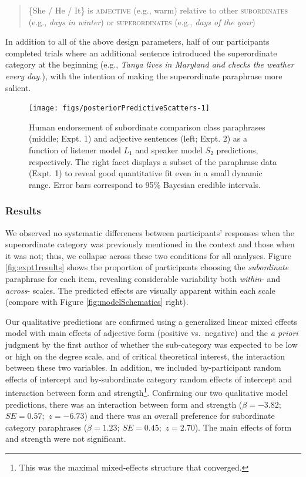 \documentclass[doc]{apa6}
\begin{document}
\begin{quote}
\{She / He / It\} is \textsc{adjective} (e.g., warm) relative to other
\textsc{subordinates} (e.g., \emph{days in winter}) or
\textsc{superordinates} (e.g., \emph{days of the year})
\end{quote}

In addition to all of the above design parameters, half of our
participants completed trials where an additional sentence introduced
the superordinate category at the beginning (e.g., \emph{Tanya lives in
Maryland and checks the weather every day.}), with the intention of
making the superordinate paraphrase more salient.

\begin{figure}[htb]

{\centering \texttt{[image: figs/posteriorPredictiveScatters-1]} 

}

\caption{Human endorsement of subordinate comparison class paraphrases (middle; Expt. 1) and adjective sentences (left; Expt. 2) as a function of listener model $L_1$ and speaker model $S_2$ predictions, respectively. The right facet displays a subset of the paraphrase data (Expt. 1) to reveal good quantitative fit even in a small dynamic range. Error bars correspond to 95\% Bayesian credible intervals.}\label{fig:posteriorPredictiveScatters}
\end{figure}

\subsubsection{Results}

We observed no systematic differences between participants' responses when the superordinate category was previously mentioned in the context and those when it was not; thus, we collapse across these two conditions for all analyses. Figure \ref{fig:expt1results} shows the proportion of participants choosing the \emph{subordinate} paraphrase for each item, revealing considerable variability both \emph{within}- and \emph{across}- scales. The predicted effects are visually apparent within each scale (compare with Figure \ref{fig:modelSchematics} right).

Our qualitative predictions are confirmed using a generalized linear mixed effects model with main effects of adjective form (positive vs.~negative) and the \emph{a priori} judgment by the first author of whether the sub-category was expected to be low or high on the degree scale, and of critical theoretical interest, the interaction between these two variables. In addition, we included by-participant random effects of intercept and by-subordinate category random effects of intercept and interaction between form and strength\footnote{This was the maximal mixed-effects structure that converged.}. Confirming our two qualitative model predictions, there was an interaction between form and strength (\(\beta = -3.82\); \(SE = 0.57;\) \(z = -6.73\)) and there was an overall preference for subordinate category paraphrases (\(\beta = 1.23\); \(SE = 0.45;\) \(z = 2.70\)). The main effects of form and strength were not significant.
\end{document}
